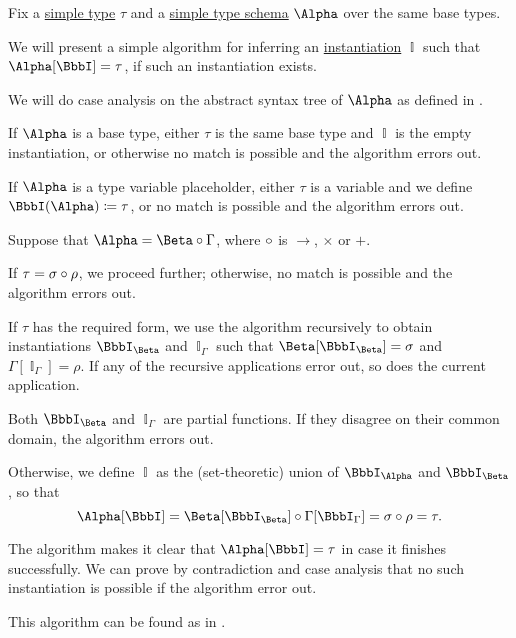 \begin{algorithm}\label{alg:simple_type_schema_inference}
  Fix a \hyperref[def:simple_type]{simple type} \( \tau \) and a \hyperref[def:simple_type_schema]{simple type schema} \( \Alpha \) over the same base types.

  We will present a simple algorithm for inferring an \hyperref[def:lambda_schema_instantiation]{instantiation} \( \BbbI \) such that \( \Alpha[\BbbI] = \tau \), if such an instantiation exists.

  We will do case analysis on the abstract syntax tree of \( \Alpha \) as defined in .
  \begin{thmenum}
     If \( \Alpha \) is a base type, either \( \tau \) is the same base type and \( \BbbI \) is the empty instantiation, or otherwise no match is possible and the algorithm errors out.

     If \( \Alpha \) is a type variable placeholder, either \( \tau \) is a variable and we define \( \BbbI(\Alpha) \coloneqq \tau \), or no match is possible and the algorithm errors out.

     Suppose that \( \Alpha = \Beta \bincirc \Gamma \), where \( {\bincirc} \) is \( {\rightarrow} \), \( {\times} \) or \( {+} \).

    If \( \tau = \sigma \bincirc \rho \), we proceed further; otherwise, no match is possible and the algorithm errors out.

    If \( \tau \) has the required form, we use the algorithm recursively to obtain instantiations \( \BbbI_\Beta \) and \( \BbbI_\Gamma \) such that \( \Beta[\BbbI_\Beta] = \sigma \) and \( \Gamma[\BbbI_\Gamma] = \rho \). If any of the recursive applications error out, so does the current application.

    Both \( \BbbI_\Beta \) and \( \BbbI_\Gamma \) are partial functions. If they disagree on their common domain, the algorithm errors out.

    Otherwise, we define \( \BbbI \) as the (set-theoretic) union of \( \BbbI_\Alpha \) and \( \BbbI_\Beta \), so that
    \begin{equation*}
      \Alpha[\BbbI] = \Beta[\BbbI_\Beta] \bincirc \Gamma[\BbbI_\Gamma] = \sigma \bincirc \rho = \tau.
    \end{equation*}
  \end{thmenum}
\end{algorithm}
\begin{defproof}
  The algorithm makes it clear that \( \Alpha[\BbbI] = \tau \) in case it finishes successfully. We can prove by contradiction and case analysis that no such instantiation is possible if the algorithm error out.
\end{defproof}
\begin{comments}
  \item This algorithm can be found as  in \cite{notebook:code}.
\end{comments}

